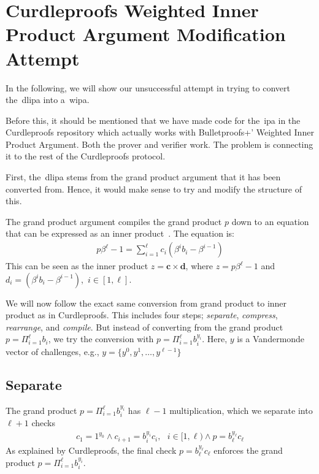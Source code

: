 
\section{Curdleproofs Weighted Inner Product Argument Modification Attempt}\label{app:curdleproofs-weighted-inner-product-argument-modification-attempt}
In the following, we will show our unsuccessful attempt in trying to convert the~\gls{dlipa} into a~\gls{wipa}.

Before this, it should be mentioned that we have made code for the~\gls{ipa} in the Curdleproofs repository which actually works with Bulletproofs+'
Weighted Inner Product Argument.
Both the prover and verifier work.
The problem is connecting it to the rest of the Curdleproofs protocol.

First, the~\gls{dlipa} stems from the grand product argument that it has been converted from.
Hence, it would make sense to try and modify the structure of this.

The grand product argument compiles the grand product $p$ down to an equation that can be expressed as an inner product~\cite{Curdleproofs}.
The equation is:
\begin{align}
    p\beta^{\ell}-1=\sum_{i=1}^{\ell}c_i(\beta^i  b_i-\beta^{i-1})
\end{align}
This can be seen as the inner product $z=\mathbf{c}\times\mathbf{d}$, where $z=p\beta^\ell-1$ and $d_i=(\beta^i b_i-\beta^{i-1})$,~$i\in[1,\ell]$.

We will now follow the exact same conversion from grand product to inner product as in Curdleproofs.
This includes four steps; \textit{separate}, \textit{compress}, \textit{rearrange}, and \textit{compile}.
But instead of converting from the grand product $p=\Pi_{i=1}^\ell b_i$, we try the conversion with $p=\Pi_{i=1}^\ell b_i^{y_i}$.
Here, $y$ is a Vandermonde vector of challenges, e.g., $y=\{y^0,y^1,\dots,y^{\ell-1}\}$

\subsection{Separate}\label{subsec:separate}
The grand product $p=\Pi_{i=1}^\ell b_i^{y_i}$ has $\ell-1$ multiplication, which we separate into $\ell+1$ checks
\begin{align}
    c_1=1^{y_0}\land c_{i+1}=b_{i}^{y_{i}}c_i,\text{ }i\in[1,\ell)\land p=b_{\ell}^{y_{\ell}}c_{\ell}
\end{align}
As explained by Curdleproofs, the final check $p=b_{\ell}^{y_{\ell}}c_{\ell}$ enforces the grand product $p=\Pi_{i=1}^\ell b_i^{y_i}$.
